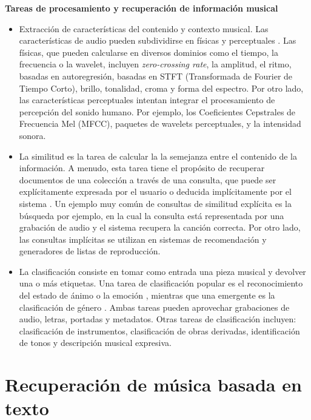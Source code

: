 \textbf{Tareas de procesamiento y recuperación de información musical}
\begin{itemize}
    \item Extracción de características del contenido y contexto musical. Las características de audio pueden subdividirse en físicas y perceptuales \cite{Alas2016ARO}. Las físicas, que pueden calcularse en diversos dominios como el tiempo, la frecuencia o la wavelet, incluyen \textit{zero-crossing rate}, la amplitud, el ritmo, basadas en autoregresión, basadas en STFT (Transformada de Fourier de Tiempo Corto), brillo, tonalidad, croma y forma del espectro. Por otro lado, las características perceptuales intentan integrar el procesamiento de percepción del sonido humano. Por ejemplo, los Coeficientes Cepstrales de Frecuencia Mel (MFCC), paquetes de wavelets perceptuales, y la intensidad sonora.
    \item La similitud es la tarea de calcular la la semejanza entre el contenido de la información. A menudo, esta tarea tiene el propósito de recuperar documentos de una colección a través de una consulta, que puede ser explícitamente expresada por el usuario o deducida implícitamente por el sistema \cite{Simonetta2019MultimodalMI}. Un ejemplo muy común de consultas de similitud explícita es la búsqueda por ejemplo, en la cual la consulta está representada por una grabación de audio y el sistema recupera la canción correcta. Por otro lado, las consultas implícitas se utilizan en sistemas de recomendación y generadores de listas de reproducción.
    \item La clasificación consiste en tomar como entrada una pieza musical y devolver una o más etiquetas. Una tarea de clasificación popular es el reconocimiento del estado de ánimo o la emoción \cite{Kim2010StateOT}, mientras que una emergente es la clasificación de género \cite{Allamy20211DCA, AthulyaK2021DeepLB, Qiu2021DBTMPEDB, Rafi2021ComparativeAO, Koparde2021ASO, Ndou2021MusicGC, Prince2022MusicGC}. Ambas tareas pueden aprovechar grabaciones de audio, letras, portadas y metadatos. Otras tareas de clasificación incluyen: clasificación de instrumentos, clasificación de obras derivadas, identificación de tonos y descripción musical expresiva.
\end{itemize}

\section{Recuperación de música basada en texto}
\label{sec:text-based retrieval}

